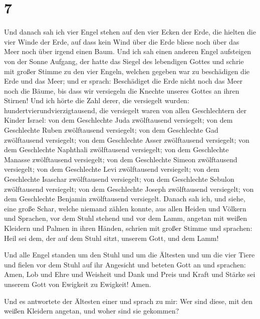 \hypertarget{section-6}{%
\section{7}\label{section-6}}

 Und danach sah ich vier Engel stehen auf den vier Ecken
der Erde, die hielten die vier Winde der Erde, auf dass kein Wind über
die Erde bliese noch über das Meer noch über irgend einen Baum.
 Und ich sah einen anderen Engel aufsteigen von der Sonne
Aufgang, der hatte das Siegel des lebendigen Gottes und schrie mit
großer Stimme zu den vier Engeln, welchen gegeben war zu beschädigen die
Erde und das Meer;  und er sprach: Beschädiget die Erde
nicht noch das Meer noch die Bäume, bis dass wir versiegeln die Knechte
unseres Gottes an ihren Stirnen!  Und ich hörte die Zahl
derer, die versiegelt wurden: hundertvierundvierzigtausend, die
versiegelt waren von allen Geschlechtern der Kinder Israel:
 von dem Geschlechte Juda zwölftausend versiegelt; von dem
Geschlechte Ruben zwölftausend versiegelt; von dem Geschlechte Gad
zwölftausend versiegelt;  von dem Geschlechte Asser
zwölftausend versiegelt; von dem Geschlechte Naphthali zwölftausend
versiegelt; von dem Geschlechte Manasse zwölftausend versiegelt;
 von dem Geschlechte Simeon zwölftausend versiegelt; von
dem Geschlechte Levi zwölftausend versiegelt; von dem Geschlechte
Isaschar zwölftausend versiegelt;  von dem Geschlechte
Sebulon zwölftausend versiegelt; von dem Geschlechte Joseph zwölftausend
versiegelt; von dem Geschlechte Benjamin zwölftausend versiegelt.
 Danach sah ich, und siehe, eine große Schar, welche
niemand zählen konnte, aus allen Heiden und Völkern und Sprachen, vor
dem Stuhl stehend und vor dem Lamm, angetan mit weißen Kleidern und
Palmen in ihren Händen,  schrien mit großer Stimme und
sprachen: Heil sei dem, der auf dem Stuhl sitzt, unserem Gott, und dem
Lamm!

 Und alle Engel standen um den Stuhl und um die Ältesten
und um die vier Tiere und fielen vor dem Stuhl auf ihr Angesicht und
beteten Gott an  und sprachen: Amen, Lob und Ehre und
Weisheit und Dank und Preis und Kraft und Stärke sei unserem Gott von
Ewigkeit zu Ewigkeit! Amen.

 Und es antwortete der Ältesten einer und sprach zu mir:
Wer sind diese, mit den weißen Kleidern angetan, und woher sind sie
gekommen?

